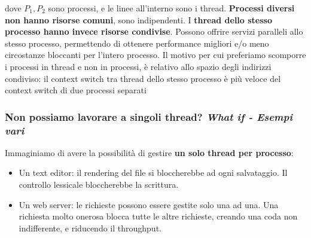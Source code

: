 \documentclass{report}
\begin{document}
\begin{center}
\end{center} %

dove $P_1,P_2$ sono processi, e le linee all'interno sono i thread. \textbf{Processi diversi non hanno risorse comuni}, sono indipendenti. I \textbf{thread dello stesso processo hanno invece risorse condivise}. Possono offrire servizi paralleli allo stesso processo, permettendo di ottenere performance migliori e/o meno circostanze bloccanti per l'intero processo. Il motivo per cui preferiamo scomporre i processi in thread e non in processi, è relativo allo spazio degli indirizzi condiviso: il context switch tra thread dello stesso processo è più veloce del context switch di due processi separati

\subsubsection{Non possiamo lavorare a singoli thread? \textit{What if - Esempi vari}}
Immaginiamo di avere la possibilità di gestire \textbf{un solo thread per processo}: 

\begin{itemize}
  \item Un text editor: il rendering del file si bloccherebbe ad ogni salvataggio. Il controllo lessicale bloccherebbe la scrittura. 
  \item Un web server: le richieste possono essere gestite solo una ad una. Una richiesta molto onerosa blocca tutte le altre richieste, creando una coda non indifferente, e riducendo il throughput.
\end{itemize}
\end{document}
